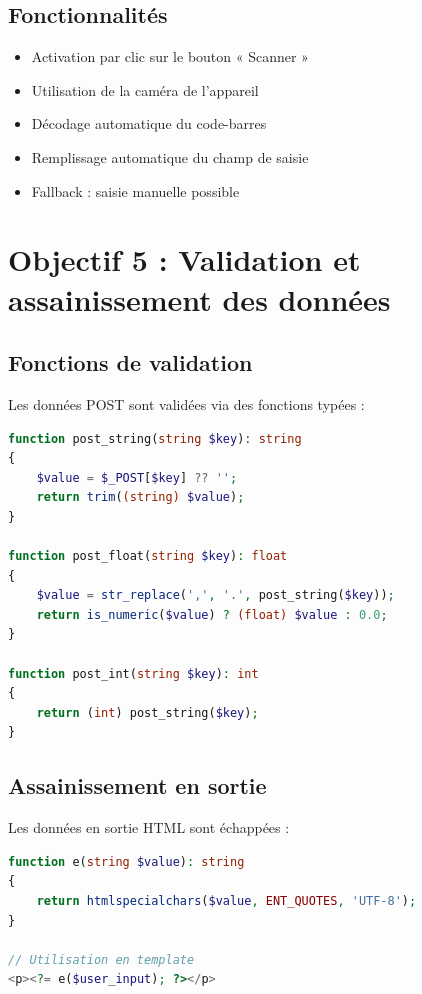 \documentclass[12pt,a4paper,french]{report}
\begin{document}
\subsection{Fonctionnalités}

\begin{itemize}
    \item Activation par clic sur le bouton « Scanner »
    \item Utilisation de la caméra de l'appareil
    \item Décodage automatique du code-barres
    \item Remplissage automatique du champ de saisie
    \item Fallback : saisie manuelle possible
\end{itemize}

\section{Objectif 5 : Validation et assainissement des données}

\subsection{Fonctions de validation}

Les données POST sont validées via des fonctions typées :

\begin{lstlisting}[language=PHP, caption=Fonctions de validation (helpers.php)]
function post_string(string $key): string
{
    $value = $_POST[$key] ?? '';
    return trim((string) $value);
}

function post_float(string $key): float
{
    $value = str_replace(',', '.', post_string($key));
    return is_numeric($value) ? (float) $value : 0.0;
}

function post_int(string $key): int
{
    return (int) post_string($key);
}
\end{lstlisting}

\subsection{Assainissement en sortie}

Les données en sortie HTML sont échappées :

\begin{lstlisting}[language=PHP]
function e(string $value): string
{
    return htmlspecialchars($value, ENT_QUOTES, 'UTF-8');
}

// Utilisation en template
<p><?= e($user_input); ?></p>
\end{lstlisting}
\end{document}
